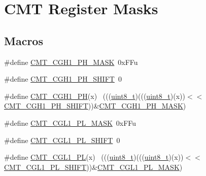\hypertarget{group___c_m_t___register___masks}{}\section{C\+MT Register Masks}
\label{group___c_m_t___register___masks}
\subsection*{Macros}
\begin{DoxyCompactItemize}
\item 
\#define \hyperlink{group___c_m_t___register___masks_ga4ca405c6721e302fabcb4ddcc7773f1a}{C\+M\+T\+\_\+\+C\+G\+H1\+\_\+\+P\+H\+\_\+\+M\+A\+SK}~0x\+F\+Fu
\item 
\#define \hyperlink{group___c_m_t___register___masks_ga6021b3f0f356c06b50371a28bf83f27e}{C\+M\+T\+\_\+\+C\+G\+H1\+\_\+\+P\+H\+\_\+\+S\+H\+I\+FT}~0
\item 
\#define \hyperlink{group___c_m_t___register___masks_ga80e8f906e7d14d8372f22abfc9138b97}{C\+M\+T\+\_\+\+C\+G\+H1\+\_\+\+PH}(x)                                                  ~(((\hyperlink{_p_e___types_8h_aba7bc1797add20fe3efdf37ced1182c5}{uint8\+\_\+t})(((\hyperlink{_p_e___types_8h_aba7bc1797add20fe3efdf37ced1182c5}{uint8\+\_\+t})(x))$<$$<$\hyperlink{group___c_m_t___register___masks_ga6021b3f0f356c06b50371a28bf83f27e}{C\+M\+T\+\_\+\+C\+G\+H1\+\_\+\+P\+H\+\_\+\+S\+H\+I\+FT}))\&\hyperlink{group___c_m_t___register___masks_ga4ca405c6721e302fabcb4ddcc7773f1a}{C\+M\+T\+\_\+\+C\+G\+H1\+\_\+\+P\+H\+\_\+\+M\+A\+SK})
\item 
\#define \hyperlink{group___c_m_t___register___masks_gab1d6a610e9cc0a024160f157f48a851f}{C\+M\+T\+\_\+\+C\+G\+L1\+\_\+\+P\+L\+\_\+\+M\+A\+SK}~0x\+F\+Fu
\item 
\#define \hyperlink{group___c_m_t___register___masks_gaa7bf093c1ef1bfd7e40a2740eafb093d}{C\+M\+T\+\_\+\+C\+G\+L1\+\_\+\+P\+L\+\_\+\+S\+H\+I\+FT}~0
\item 
\#define \hyperlink{group___c_m_t___register___masks_ga44c85b7bf2d25219997d1205e1f4ec9a}{C\+M\+T\+\_\+\+C\+G\+L1\+\_\+\+PL}(x)                                                  ~(((\hyperlink{_p_e___types_8h_aba7bc1797add20fe3efdf37ced1182c5}{uint8\+\_\+t})(((\hyperlink{_p_e___types_8h_aba7bc1797add20fe3efdf37ced1182c5}{uint8\+\_\+t})(x))$<$$<$\hyperlink{group___c_m_t___register___masks_gaa7bf093c1ef1bfd7e40a2740eafb093d}{C\+M\+T\+\_\+\+C\+G\+L1\+\_\+\+P\+L\+\_\+\+S\+H\+I\+FT}))\&\hyperlink{group___c_m_t___register___masks_gab1d6a610e9cc0a024160f157f48a851f}{C\+M\+T\+\_\+\+C\+G\+L1\+\_\+\+P\+L\+\_\+\+M\+A\+SK})

\end{DoxyCompactItemize}

